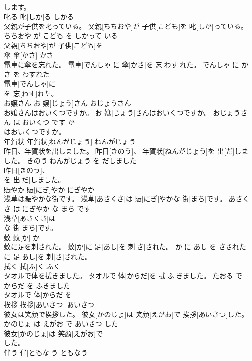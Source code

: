 \documentclass[8pt]{extreport}
\begin{document}
\begin{CJK}{UTF8}{min}
\\	します。			
\\	叱る	叱[しか]る	しかる	
\\	父親が子供を叱っている。	父親[ちちおや]が 子供[こども]を 叱[しか]っている。	ちちおや が こども を しかって いる	
\\	父親[ちちおや]が 子供[こども]を
\\	傘	傘[かさ]	かさ	
\\	電車に傘を忘れた。	電車[でんしゃ]に 傘[かさ]を 忘[わす]れた。	でんしゃ に かさ を わすれた	
\\	電車[でんしゃ]に
\\	を 忘[わす]れた。			
\\	お嬢さん	お 嬢[じょう]さん	おじょうさん	
\\	お嬢さんはおいくつですか。	お 嬢[じょう]さんはおいくつですか。	おじょうさん は おいくつ です か	
\\	はおいくつですか。			
\\	年賀状	年賀状[ねんがじょう]	ねんがじょう	
\\	昨日、年賀状を出しました。	昨日[きのう]、 年賀状[ねんがじょう]を 出[だ]しました。	きのう ねんがじょう を だしました	
\\	昨日[きのう]、
\\	を 出[だ]しました。			
\\	賑やか	賑[にぎ]やか	にぎやか	
\\	浅草は賑やかな街です。	浅草[あさくさ]は 賑[にぎ]やかな 街[まち]です。	あさくさ は にぎやか な まち です	
\\	浅草[あさくさ]は
\\	な 街[まち]です。			
\\	蚊	蚊[か]	か	
\\	蚊に足を刺された。	蚊[か]に 足[あし]を 刺[さ]された。	か に あし を さされた	
\\	に 足[あし]を 刺[さ]された。			
\\	拭く	拭[ふ]く	ふく	
\\	タオルで体を拭きました。	タオルで 体[からだ]を 拭[ふ]きました。	たおる で からだ を ふきました	
\\	タオルで 体[からだ]を
\\	挨拶	挨拶[あいさつ]	あいさつ	
\\	彼女は笑顔で挨拶した。	彼女[かのじょ]は 笑顔[えがお]で 挨拶[あいさつ]した。	かのじょ は えがお で あいさつ した	
\\	彼女[かのじょ]は 笑顔[えがお]で
\\	した。			
\\	伴う	伴[ともな]う	ともなう	

\end{CJK}
\end{document}
